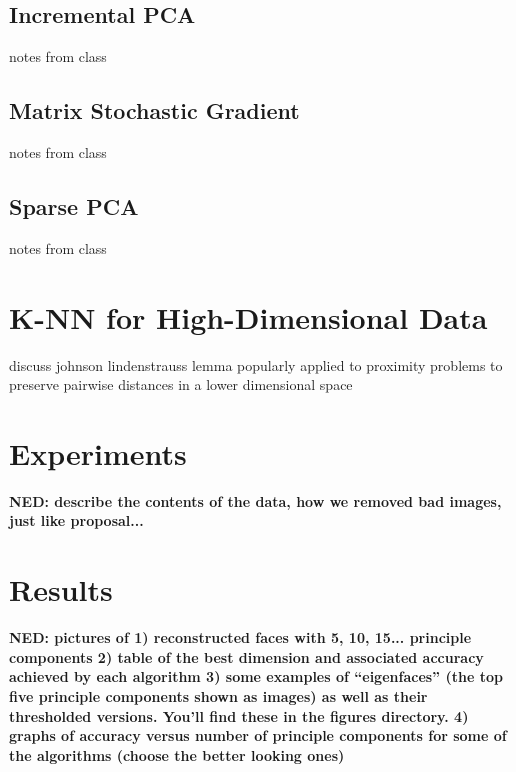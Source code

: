\documentclass[11pt,letterpaper]{article}
\begin{document}
\subsection{Incremental PCA}
notes from class


\subsection{Matrix Stochastic Gradient}

notes from class

\subsection{Sparse PCA}

notes from class


\section{K-NN for High-Dimensional Data}

discuss johnson lindenstrauss lemma popularly applied to proximity problems to preserve pairwise distances in a lower dimensional space

\section{Experiments}

{\bf NED: describe the contents of the data, how we removed bad images, just like proposal...} 

\section{Results}

{\bf NED: pictures of 1) reconstructed faces with 5, 10, 15... principle components 
2) table of the best dimension and associated accuracy achieved by each algorithm 
3) some examples of ``eigenfaces'' (the top five principle components shown as images) as well as their thresholded versions. You'll find these in the figures directory. 
4) graphs of accuracy versus number of principle components for some of the algorithms (choose the better looking ones)}
\end{document}
